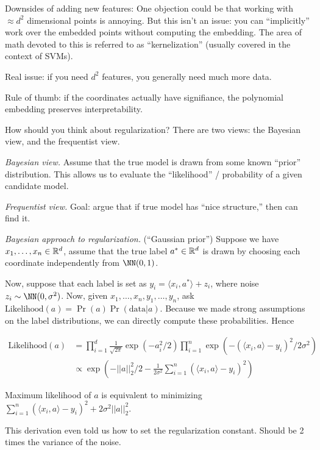 \documentclass[8pt]{article}
\begin{document}
Downsides of adding new features:
   One objection could be that working with $\approx d^2$ dimensional points is annoying.  But this isn't an issue: you can ``implicitly'' work over the embedded points without computing the embedding.  The area of math devoted to this is referred to as ``kernelization'' (usually covered in the context of SVMs).

   Real issue: if you need $d^2$ features, you generally need much more data.

Rule of thumb: if the coordinates actually have signifiance, the polynomial embedding preserves interpretability.

How should you think about regularization?  There are two views: the Bayesian view, and the frequentist view.

   {\it Bayesian view.} Assume that the true model is drawn from some known ``prior'' distribution.  This allows us to evaluate the ``likelihood'' / probability of a given candidate model.

   {\it Frequentist view.} Goal: argue that if true model has ``nice structure,'' then can find it.

{\it Bayesian approach to regularization.} (``Gaussian prior'') Suppose we have $x_1, \dots, x_n \in \mathbb{R}^d$, assume that the true label $a^{*} \in \mathbb{R}^d$ is drawn by choosing each coordinate independently from $\NN(0, 1)$.

Now, suppose that each label is set as $y_i = \langle x_i, a^{*} \rangle + z_i$, where noise $z_i \sim \NN(0, \sigma^2)$.  Now, given $x_1, \dots, x_n, y_1, \dots, y_n$, ask $\text{Likelihood}(a) = \Pr(a) \Pr(\text{data} | a).$
Because we made strong assumptions on the label distributions, we can directly compute these probabilities.  Hence

\begin{align*}
  \text{Likelihood}(a) &= \prod_{i=1}^{d} \frac{1}{\sqrt{2\pi}}\exp (- a_i^2 / 2) \prod_{i=1}^{n} \exp (- (\langle x_i, a \rangle - y_i)^2 / 2 \sigma^2) \\
  &\propto \exp (-||a||_2^2 / 2 - \frac{1}{2 \sigma^2} \sum_{i=1}^{n} \left( \langle x_i, a \rangle - y_i\right)^2)
\end{align*}

Maximum likelihood of $a$ is equivalent to minimizing $\sum_{i=1}^{n} \left( \langle x_i, a \rangle - y_i \right)^2 + 2 \sigma^2 ||a||_{2}^{2}.$

This derivation even told us how to set the regularization constant.  Should be 2 times the variance of the noise.
\end{document}
